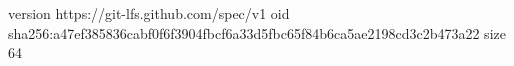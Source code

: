 version https://git-lfs.github.com/spec/v1
oid sha256:a47ef385836cabf0f6f3904fbcf6a33d5fbc65f84b6ca5ae2198cd3c2b473a22
size 64
